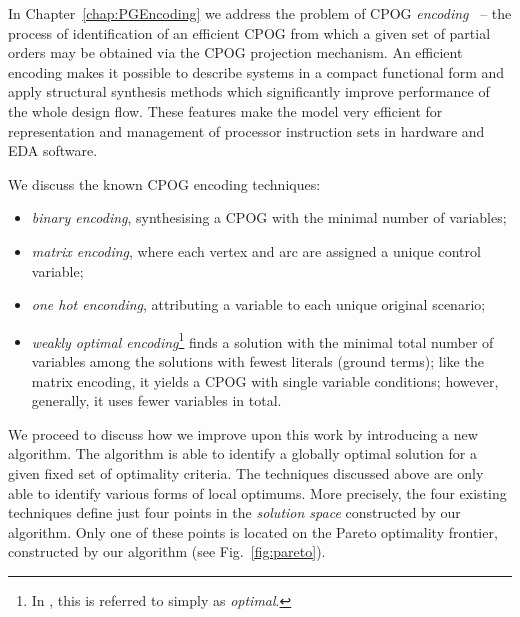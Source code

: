 In Chapter~\ref{chap:PGEncoding} we address the problem of CPOG \emph{encoding}~\cite{2009_mokhov_phd} -- the process of identification of an efficient CPOG from which a given set of partial orders may be obtained via the CPOG projection mechanism. An efficient encoding makes it possible to describe systems in
a compact functional form and apply structural synthesis methods which
significantly improve performance of the whole design flow. These
features make the model very efficient for representation and management
of processor instruction sets in hardware and EDA software. 

We discuss the known CPOG encoding techniques:
\begin{itemize}
\item \emph{binary encoding}, synthesising a CPOG with the minimal number of variables;
\item \emph{matrix encoding}, where each vertex and arc are assigned a unique control variable;
\item \emph{one hot enconding}, attributing a variable to each unique original scenario;
\item \emph{weakly optimal encoding}\footnote{In \cite{2009_mokhov_phd}, this is referred to simply as \emph{optimal}.} finds a solution with the minimal total number of variables among the solutions with fewest literals (ground terms); like the matrix encoding, it yields a CPOG with single variable conditions; however, generally, it uses fewer variables in total.    
\end{itemize}

We proceed to discuss how we improve upon this work by introducing a new algorithm. The algorithm is able to identify a globally optimal solution for a given fixed set of optimality criteria. The techniques discussed above are only able to identify various forms of local optimums. More precisely, the four existing techniques define just four points in the \emph{solution space} constructed by our algorithm. Only one of these points is located on the Pareto optimality frontier, constructed by our algorithm (see Fig.~\ref{fig:pareto}).

